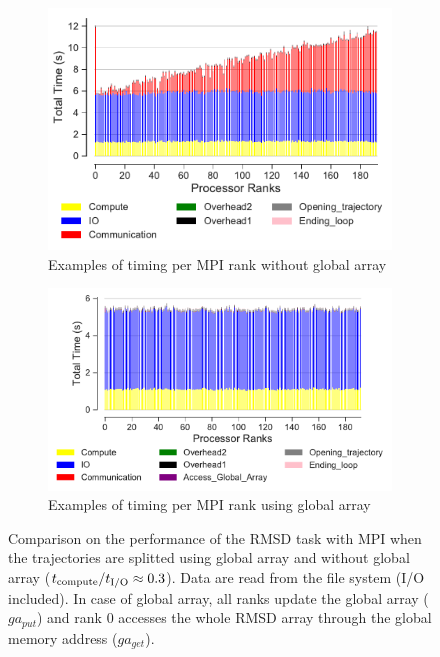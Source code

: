 \begin{figure}[ht!]
\begin{subfigure} {.5\textwidth}
  \includegraphics[width=\linewidth]{figures/split-BarPlot-rank-comparison_192_5.pdf}
   \caption{Examples of timing per MPI rank without global array}
  \label{fig:MPIranks-split}
\end{subfigure}
\hfill
\begin{subfigure} {.5\textwidth}
  \includegraphics[width=\linewidth]{figures/split-ga-BarPlot-rank-comparison_192_5.pdf}
  \caption{Examples of timing per MPI rank using global array}
  \label{fig:MPIranks-split-ga}
\end{subfigure}

\caption{Comparison on the performance of the RMSD task with MPI when the trajectories are splitted using global array and without global array (${t}_{\text{compute}}/{t}_{\text{I/O}} \approx 0.3$).
Data are read from the file system (I/O included). In case of global array, all ranks update the global array ($ga_{put}$) and rank 0 accesses the whole RMSD array through the global memory address ($ga_{get}$).}
\label{fig:MPIwithIO-split}
\end{figure}

